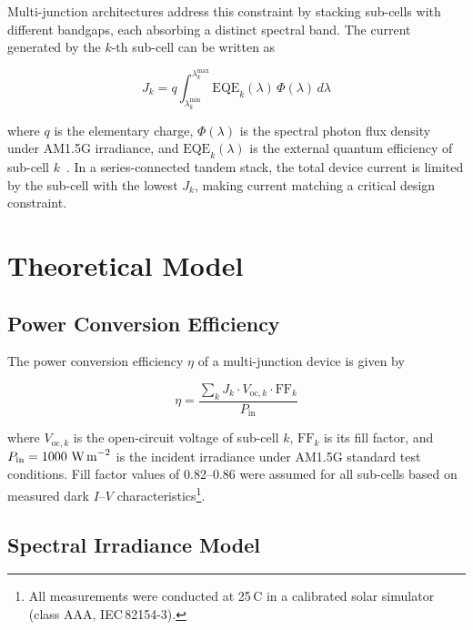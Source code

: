 \documentclass[10pt,twocolumn]{article}
\begin{document}
Multi-junction architectures address this constraint by stacking sub-cells with different
bandgaps, each absorbing a distinct spectral band. The current generated by the $k$-th
sub-cell can be written as

\begin{equation}
  J_k = q \int_{\lambda_k^{\min}}^{\lambda_k^{\max}} \text{EQE}_k(\lambda)\,
        \Phi(\lambda)\, d\lambda
  \label{eq:subcell_current}
\end{equation}

\noindent
where $q$ is the elementary charge, $\Phi(\lambda)$ is the spectral photon flux density
under AM1.5G irradiance, and $\text{EQE}_k(\lambda)$ is the external quantum efficiency
of sub-cell $k$~\cite{wakabayashi2019}. In a series-connected tandem stack, the total device current is limited
by the sub-cell with the lowest $J_k$, making current matching a critical design constraint.

\section{Theoretical Model}

\subsection{Power Conversion Efficiency}

The power conversion efficiency $\eta$ of a multi-junction device is given by

\begin{equation}
  \eta = \frac{\sum_{k} J_k \cdot V_{\text{oc},k} \cdot \text{FF}_k}{P_{\text{in}}}
  \label{eq:pce}
\end{equation}

\noindent
where $V_{\text{oc},k}$ is the open-circuit voltage of sub-cell $k$, $\text{FF}_k$ is its
fill factor, and $P_{\text{in}} = 1000\ \text{W\,m}^{-2}$ is the incident irradiance under
AM1.5G standard test conditions. Fill factor values of 0.82--0.86 were assumed for all
sub-cells based on measured dark $I$--$V$ characteristics\footnote{All measurements were
conducted at 25\,\textdegree C in a calibrated solar simulator (class AAA, IEC\,82154-3).}.

\subsection{Spectral Irradiance Model}
\end{document}
